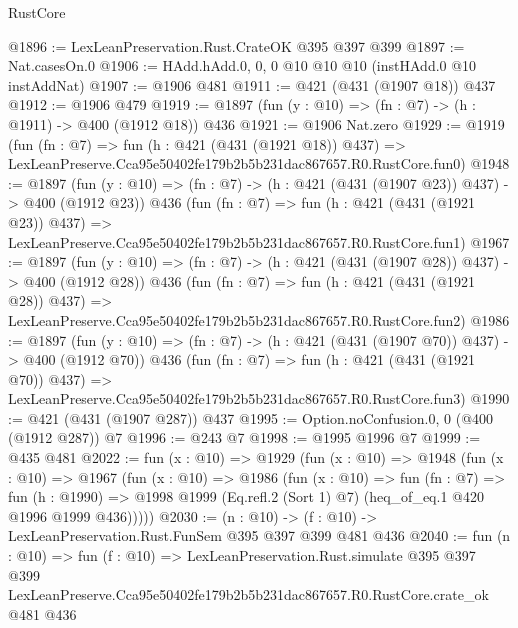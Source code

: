 \begin{lexlean}{RustCore}
\begin{coremodule}
@1896 := LexLeanPreservation.Rust.CrateOK @395 @397 @399
@1897 := Nat.casesOn.{0}
@1906 := HAdd.hAdd.{0, 0, 0} @10 @10 @10 (instHAdd.{0} @10 instAddNat)
@1907 := @1906 @481
@1911 := @421 (@431 (@1907 @18)) @437
@1912 := @1906 @479
@1919 := @1897 (fun (y : @10) => (fn : @7) -> (h : @1911) -> @400 (@1912 @18)) @436
@1921 := @1906 Nat.zero
@1929 := @1919
    (fun (fn : @7) =>
    fun (h : @421 (@431 (@1921 @18)) @437) =>
    LexLeanPreserve.Cca95e50402fe179b2b5b231dac867657.R0.RustCore.fun0)
@1948 := @1897
    (fun (y : @10) => (fn : @7) -> (h : @421 (@431 (@1907 @23)) @437) -> @400 (@1912 @23))
    @436
    (fun (fn : @7) =>
    fun (h : @421 (@431 (@1921 @23)) @437) =>
    LexLeanPreserve.Cca95e50402fe179b2b5b231dac867657.R0.RustCore.fun1)
@1967 := @1897
    (fun (y : @10) => (fn : @7) -> (h : @421 (@431 (@1907 @28)) @437) -> @400 (@1912 @28))
    @436
    (fun (fn : @7) =>
    fun (h : @421 (@431 (@1921 @28)) @437) =>
    LexLeanPreserve.Cca95e50402fe179b2b5b231dac867657.R0.RustCore.fun2)
@1986 := @1897
    (fun (y : @10) => (fn : @7) -> (h : @421 (@431 (@1907 @70)) @437) -> @400 (@1912 @70))
    @436
    (fun (fn : @7) =>
    fun (h : @421 (@431 (@1921 @70)) @437) =>
    LexLeanPreserve.Cca95e50402fe179b2b5b231dac867657.R0.RustCore.fun3)
@1990 := @421 (@431 (@1907 @287)) @437
@1995 := Option.noConfusion.{0, 0} (@400 (@1912 @287)) @7
@1996 := @243 @7
@1998 := @1995 @1996 @7
@1999 := @435 @481
@2022 := fun (x : @10) =>
  @1929
    (fun (x : @10) =>
    @1948
      (fun (x : @10) =>
      @1967
        (fun (x : @10) =>
        @1986
          (fun (x : @10) =>
          fun (fn : @7) =>
          fun (h : @1990) =>
          @1998 @1999 (Eq.refl.{2} (Sort 1) @7) (heq_of_eq.{1} @420 @1996 @1999 @436)))))
@2030 := (n : @10) -> (f : @10) -> LexLeanPreservation.Rust.FunSem @395 @397 @399 @481 @436
@2040 := fun (n : @10) =>
  fun (f : @10) =>
  LexLeanPreservation.Rust.simulate
    @395
    @397
    @399
    LexLeanPreserve.Cca95e50402fe179b2b5b231dac867657.R0.RustCore.crate_ok
    @481
    @436
\end{coremodule}
\end{lexlean}
